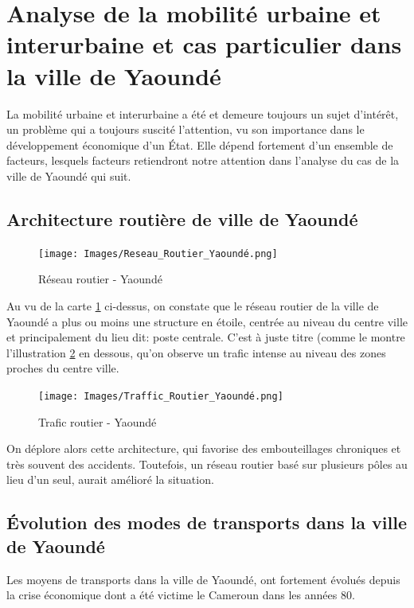 \section{Analyse de la mobilité urbaine et interurbaine et cas particulier dans la ville de Yaoundé}

La mobilité urbaine et interurbaine a été et demeure toujours un sujet d'intérêt, un problème qui a toujours suscité l'attention, vu son importance dans le développement économique d'un État. Elle dépend fortement d'un ensemble de facteurs, lesquels facteurs retiendront notre attention dans l'analyse du cas de la ville de Yaoundé qui suit.

\subsection{Architecture routière de ville de Yaoundé}

\begin{figure}[h]
    \centering
    \texttt{[image: Images/Reseau\_Routier\_Yaoundé.png]}
    \caption{Réseau routier - Yaoundé}
    \label{fig:reseau_routier}
    \cite{mfoulou2016mobilite}
\end{figure}

Au vu de la carte \ref{fig:reseau_routier} ci-dessus, on constate que le réseau routier de la ville de Yaoundé a plus ou moins une structure en étoile, centrée au niveau du centre ville et principalement du lieu dit: poste centrale. 
C'est à juste titre (comme le montre l'illustration \ref{fig:trafic_routier} en dessous, qu'on observe un trafic intense au niveau des zones proches du centre ville.

\begin{figure}[h]
    \centering
    \texttt{[image: Images/Traffic\_Routier\_Yaoundé.png]}
    \caption{Trafic routier - Yaoundé}
    \label{fig:trafic_routier}
    \cite{mfoulou2016mobilite}
\end{figure}

On déplore alors cette architecture, qui favorise des embouteillages chroniques et très souvent des accidents.
Toutefois, un réseau routier basé sur plusieurs pôles au lieu d'un seul, aurait amélioré la situation.

\subsection{Évolution des modes de transports dans la ville de Yaoundé}

Les moyens de transports dans la ville de Yaoundé, ont fortement évolués depuis la crise économique dont a été victime le Cameroun dans les années 80. 

